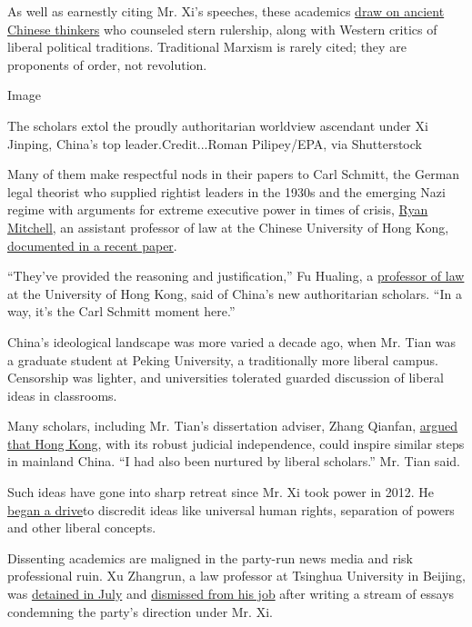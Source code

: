 As well as earnestly citing Mr. Xi's speeches, these academics
\href{http://www.ccps.gov.cn/bkjd/xzglgg/xzglgg2019_08/201909/t20190923_134457.shtml}{draw
on ancient Chinese thinkers} who counseled stern rulership, along with
Western critics of liberal political traditions. Traditional Marxism is
rarely cited; they are proponents of order, not revolution.

Image

The scholars extol the proudly authoritarian worldview ascendant under
Xi Jinping, China's top leader.Credit...Roman Pilipey/EPA, via
Shutterstock

Many of them make respectful nods in their papers to Carl Schmitt, the
German legal theorist who supplied rightist leaders in the 1930s and the
emerging Nazi regime with arguments for extreme executive power in times
of crisis,
\href{https://www.law.cuhk.edu.hk/app/people/prof-ryan-mitchell/}{Ryan
Mitchell}, an assistant professor of law at the Chinese University of
Hong Kong,
\href{https://papers.ssrn.com/sol3/papers.cfm?abstract_id=3400946}{documented
in a recent paper}.

``They've provided the reasoning and justification,'' Fu Hualing, a
\href{https://www.law.hku.hk/academic_staff/professor-fu-hualing/}{professor
of law} at the University of Hong Kong, said of China's new
authoritarian scholars. ``In a way, it's the Carl Schmitt moment here.''

China's ideological landscape was more varied a decade ago, when Mr.
Tian was a graduate student at Peking University, a traditionally more
liberal campus. Censorship was lighter, and universities tolerated
guarded discussion of liberal ideas in classrooms.

Many scholars, including Mr. Tian's dissertation adviser, Zhang Qianfan,
\href{http://www.calaw.cn/article/default.asp?id=1238}{argued that Hong
Kong}, with its robust judicial independence, could inspire similar
steps in mainland China. ``I had also been nurtured by liberal
scholars.'' Mr. Tian said.

Such ideas have gone into sharp retreat since Mr. Xi took power in 2012.
He
\href{https://www.nytimes3xbfgragh.onion/2013/08/20/world/asia/chinas-new-leadership-takes-hard-line-in-secret-memo.html}{began
a drive}to discredit ideas like universal human rights, separation of
powers and other liberal concepts.

Dissenting academics are maligned in the party-run news media and risk
professional ruin. Xu Zhangrun, a law professor at Tsinghua University
in Beijing, was
\href{https://www.nytimes3xbfgragh.onion/2020/07/12/world/asia/xu-zhangrun-china-xi.html}{detained
in July} and
\href{https://chinadigitaltimes.net/2020/07/xi-critic-xu-zhangrun-released-from-detention-fired-from-tsinghua-university/}{dismissed
from his job} after writing a stream of essays condemning the party's
direction under Mr. Xi.

